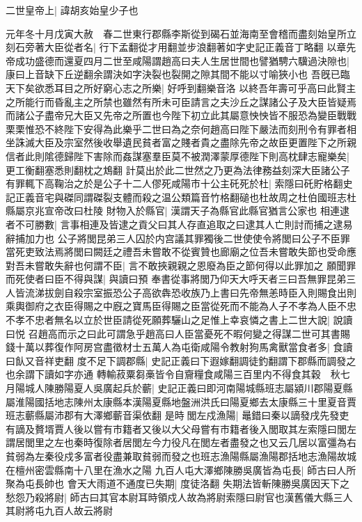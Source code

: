 二世皇帝上|{
	諱胡亥始皇少子也}


元年冬十月戊寅大赦　春二世東行郡縣李斯從到碣石並海南至會稽而盡刻始皇所立刻石旁著大臣從者名|{
	行下孟翻從才用翻並步浪翻著如字史記正義音丁略翻}
以章先帝成功盛德而還夏四月二世至咸陽謂趙高曰夫人生居世間也譬猶騁六驥過決隙也|{
	康曰上音缺下丘逆翻余謂決如字決裂也裂開之隙其間不能以寸喻狹小也}
吾旣已臨天下矣欲悉耳目之所好窮心志之所樂|{
	好呼到翻樂音洛}
以終吾年壽可乎高曰此賢主之所能行而昏亂主之所禁也雖然有所未可臣請言之夫沙丘之謀諸公子及大臣皆疑焉而諸公子盡帝兄大臣又先帝之所置也今陛下初立此其屬意怏怏皆不服恐為變臣戰戰栗栗惟恐不終陛下安得為此樂乎二世曰為之奈何趙高曰陛下嚴法而刻刑令有罪者相坐誅滅大臣及宗室然後收舉遺民貧者富之賤者貴之盡除先帝之故臣更置陛下之所親信者此則隂德歸陛下害除而姦謀塞羣臣莫不被潤澤蒙厚德陛下則高枕肆志寵樂矣|{
	更工衡翻塞悉則翻枕之鴆翻}
計莫出於此二世然之乃更為法律務益刻深大臣諸公子有罪輒下高鞠治之於是公子十二人僇死咸陽市十公主矺死於杜|{
	索隱曰矺貯格翻史記正義音宅與磔同謂磔裂支體而殺之温公類篇音竹格翻磓也杜故周之杜伯國班志杜縣屬京兆宣帝改曰杜陵}
財物入於縣官|{
	漢謂天子為縣官此縣官猶言公家也}
相連逮者不可勝數|{
	言事相連及皆逮之貢父曰其人存直追取之曰逮其人亡則討而捕之逮易辭捕加力也}
公子將閭昆弟三人囚於内宫議其罪獨後二世使使令將閭曰公子不臣罪當死吏致法焉將閭曰闕廷之禮吾未嘗敢不從賓贊也廊廟之位吾未嘗敢失節也受命應對吾未嘗敢失辭也何謂不臣|{
	言不敢挾親親之恩廢為臣之節何得以此罪加之}
願聞罪而死使者曰臣不得與謀|{
	與讀曰預}
奉書從事將閭乃仰天大呼天者三曰吾無罪昆弟三人皆流涕拔劍自殺宗室振恐公子高欲犇恐收族乃上書曰先帝無恙時臣入則賜食出則乘輿御府之衣臣得賜之中廐之寶馬臣得賜之臣當從死而不能為人子不孝為人臣不忠不孝不忠者無名以立於世臣請從死願葬驪山之足惟上幸哀憐之書上二世大說|{
	說讀曰悦}
召趙高而示之曰此可謂急乎趙高曰人臣當憂死不暇何變之得謀二世可其書賜錢十萬以葬復作阿房宫盡徵材士五萬人為屯衛咸陽令教射狗馬禽獸當食者多|{
	食讀曰飤又音祥吏翻}
度不足下調郡縣|{
	史記正義曰下遐嫁翻調徒釣翻謂下郡縣而調發之也余謂下讀如字亦通}
轉輸菽粟芻槀皆令自齎糧食咸陽三百里内不得食其穀　秋七月陽城人陳勝陽夏人吳廣起兵於蘄|{
	史記正義曰即河南陽城縣班志屬潁川郡陽夏縣屬淮陽國括地志陳州太康縣本漢陽夏縣地盤洲洪氏曰陽夏鄉去太康縣三十里夏音賈班志蘄縣屬沛郡有大澤鄉蘄音渠依翻}
是時閭左戍漁陽|{
	鼂錯曰秦以謫發戌先發吏有謫及贅壻賈人後以嘗有市籍者又後以大父母嘗有市籍者後入閭取其左索隱曰閭左謂居閭里之左也秦時復除者居閭左今力役凡在閭左者盡發之也又云几居以富彊為右貧弱為左秦役戍多富者役盡兼取貧弱而發之也班志漁陽縣屬漁陽郡括地志漁陽故城在檀州密雲縣南十八里在漁水之陽}
九百人屯大澤鄉陳勝吳廣皆為屯長|{
	師古曰人所聚為屯長帥也}
會天大雨道不通度已失期|{
	度徒洛翻}
失期法皆斬陳勝吳廣因天下之愁怨乃殺將尉|{
	師古曰其官本尉耳時領戍人故為將尉索隱曰尉官也漢舊儀大縣三人其尉將屯九百人故云將尉}
